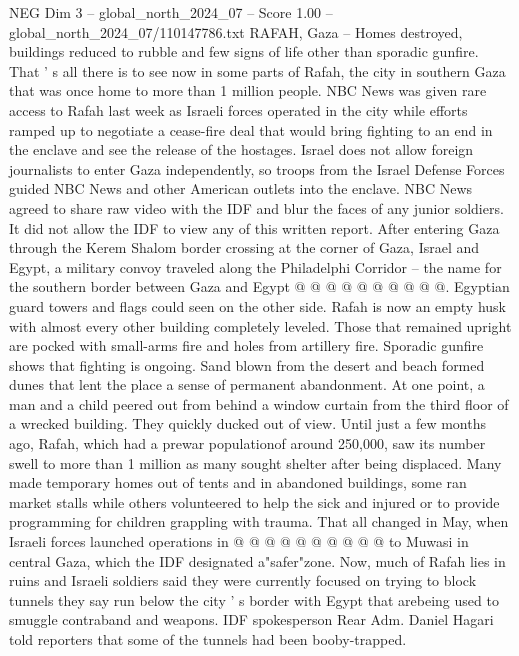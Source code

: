 \begin{textsample}{NEG Dim 3 – global\_north\_2024\_07 – Score 1.00 – global\_north\_2024\_07/110147786.txt}  \label{ex:f3_neg_373}
RAFAH, Gaza -- Homes destroyed, buildings reduced to rubble and few signs of life other than sporadic gunfire.
That ' s all there is to see now in some parts of Rafah, the city in southern Gaza that was once home to more than 1 million people.
NBC News was given rare access to Rafah last week as Israeli forces operated in the city while efforts ramped up to negotiate a cease-fire deal that would bring fighting to an end in the enclave and see the release of the hostages.
Israel does not allow foreign journalists to enter Gaza independently, so troops from the Israel Defense Forces guided NBC News and other American outlets into the enclave.
NBC News agreed to share raw video with the IDF and blur the faces of any junior soldiers.
It did not allow the IDF to view any of this written report.
After entering Gaza through the Kerem Shalom border crossing at the corner of Gaza, Israel and Egypt, a military convoy traveled along the Philadelphi Corridor -- the name for the southern border between Gaza and Egypt @ @ @ @ @ @ @ @ @ @.
Egyptian guard towers and flags could seen on the other side.
Rafah is now an empty husk with almost every other building completely leveled.
Those that remained upright are pocked with small-arms fire and holes from artillery fire.
Sporadic gunfire shows that fighting is ongoing.
Sand blown from the desert and beach formed dunes that lent the place a sense of permanent abandonment.
At one point, a man and a child peered out from behind a window curtain from the third floor of a wrecked building.
They quickly ducked out of view.
Until just a few months ago, Rafah, which had a prewar populationof around 250,000, saw its number swell to more than 1 million as many sought shelter after being displaced.
Many made temporary homes out of tents and in abandoned buildings, some ran market stalls while others volunteered to help the sick and injured or to provide programming for children grappling with trauma.
That all changed in May, when Israeli forces launched operations in @ @ @ @ @ @ @ @ @ @ to Muwasi in central Gaza, which the IDF designated a"safer"zone.
Now, much of Rafah lies in ruins and Israeli soldiers said they were currently focused on trying to block tunnels they say run below the city ' s border with Egypt that arebeing used to smuggle contraband and weapons.
IDF spokesperson Rear Adm.
Daniel Hagari told reporters that some of the tunnels had been booby-trapped.

\end{textsample}
